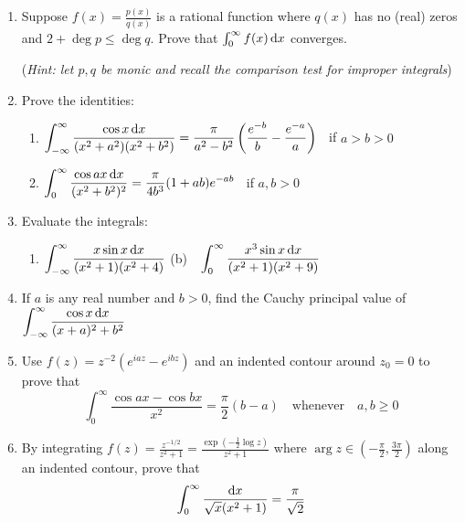 \begin{exercises}
\begin{enumerate}
	  
	  \item\label{exs:rationalimpint} Suppose $f(x)=\frac{p(x)}{q(x)}$ is a rational function where $q(x)$ has no (real) zeros and $2+\deg p\le\deg q$. Prove that $\int_0^\infty f(x)\,{\mathrm{d} x}$ converges.\par
	  (\emph{Hint: let $p,q$ be monic and recall the comparison test for improper integrals})
	
	
	  \item Prove the identities:
	  \begin{enumerate}
	    \item $\displaystyle\int_{-\infty}^\infty \frac{\cos x\,{\mathrm{d} x}}{(x^2+a^2)(x^2+b^2)} =\frac\pi{a^2-b^2}\left(\frac{e^{-b}}b-\frac{e^{-a}}a\right)$ \ if $a>b>0$
	    
	    
	    \item $\displaystyle\int_{0}^\infty \frac{\cos ax\,{\mathrm{d} x}}{(x^2+b^2)^2} =\frac\pi{4b^3}(1+ab)e^{-ab}$ \ if $a,b>0$
	    
		\end{enumerate}
		
		
		\item Evaluate the integrals:
	  \begin{enumerate}
	    \item $\displaystyle\int_{-\infty}^\infty \frac{x\sin x\,{\mathrm{d} x}}{(x^2+1)(x^2+4)}$
	    \qquad\qquad
	    (b)\ \ $\displaystyle\int_{0}^\infty \frac{x^3\sin x\,{\mathrm{d} x}}{(x^2+1)(x^2+9)}$
		\end{enumerate}
		
		
		\item If $a$ is any real number and $b>0$, find the Cauchy principal value of $\displaystyle\int_{-\infty}^\infty\frac{\cos x\,{\mathrm{d} x}}{(x+a)^2+b^2}$
		
		
		\item Use $f(z)=z^{-2}(e^{i az}-e^{i bz})$ and an indented contour around $z_0=0$ to prove that
		\[
			\int_0^\infty \frac{\cos ax-\cos bx}{x^2} =\frac\pi 2(b-a)
			\quad\text{whenever}\quad
			a,b\ge 0
		\]
		
		
		\item By integrating $f(z)=\frac{z^{-1/2}}{z^2+1}=\frac{\exp(-\frac 12\log z)}{z^2+1}$ where $\arg z\in(-\frac\pi 2,\frac{3\pi}2)$ along an indented contour, prove that
		\[
			\int_0^\infty \frac{{\mathrm{d} x}}{\sqrt x(x^2+1)} =\frac\pi{\sqrt 2}
		\]
	  

\end{enumerate}
\end{exercises}
